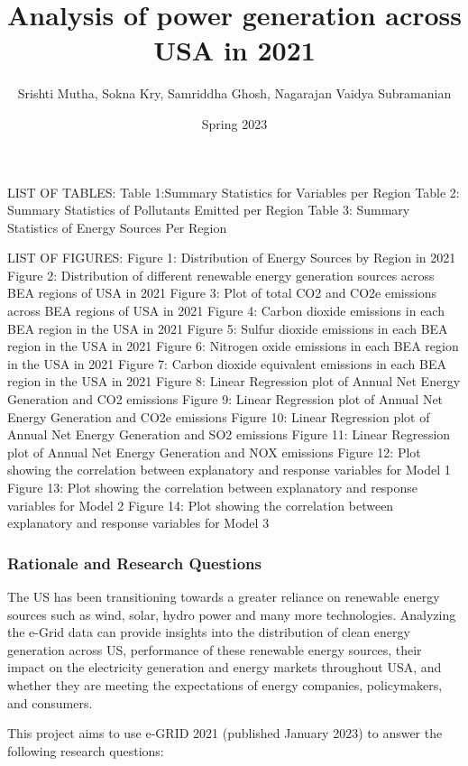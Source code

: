 \documentclass[
]{article}
\title{Analysis of power generation across USA in 2021}
\author{Srishti Mutha, Sokna Kry, Samriddha Ghosh, Nagarajan Vaidya
Subramanian}
\date{Spring 2023}
\begin{document}
\maketitle

LIST OF TABLES: Table 1:Summary Statistics for Variables per Region
Table 2: Summary Statistics of Pollutants Emitted per Region Table 3:
Summary Statistics of Energy Sources Per Region

LIST OF FIGURES: Figure 1: Distribution of Energy Sources by Region in
2021 Figure 2: Distribution of different renewable energy generation
sources across BEA regions of USA in 2021 Figure 3: Plot of total CO2
and CO2e emissions across BEA regions of USA in 2021 Figure 4: Carbon
dioxide emissions in each BEA region in the USA in 2021 Figure 5: Sulfur
dioxide emissions in each BEA region in the USA in 2021 Figure 6:
Nitrogen oxide emissions in each BEA region in the USA in 2021 Figure 7:
Carbon dioxide equivalent emissions in each BEA region in the USA in
2021 Figure 8: Linear Regression plot of Annual Net Energy Generation
and CO2 emissions Figure 9: Linear Regression plot of Annual Net Energy
Generation and CO2e emissions Figure 10: Linear Regression plot of
Annual Net Energy Generation and SO2 emissions Figure 11: Linear
Regression plot of Annual Net Energy Generation and NOX emissions Figure
12: Plot showing the correlation between explanatory and response
variables for Model 1 Figure 13: Plot showing the correlation between
explanatory and response variables for Model 2 Figure 14: Plot showing
the correlation between explanatory and response variables for Model 3

\hypertarget{rationale-and-research-questions}{%
\subsubsection{Rationale and Research
Questions}\label{rationale-and-research-questions}}

The US has been transitioning towards a greater reliance on renewable
energy sources such as wind, solar, hydro power and many more
technologies. Analyzing the e-Grid data can provide insights into the
distribution of clean energy generation across US, performance of these
renewable energy sources, their impact on the electricity generation and
energy markets throughout USA, and whether they are meeting the
expectations of energy companies, policymakers, and consumers.

This project aims to use e-GRID 2021 (published January 2023) to answer
the following research questions:
\end{document}
